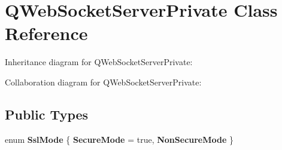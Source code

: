\hypertarget{class_q_web_socket_server_private}{}\section{Q\+Web\+Socket\+Server\+Private Class Reference}
\label{class_q_web_socket_server_private}


Inheritance diagram for Q\+Web\+Socket\+Server\+Private\+:


Collaboration diagram for Q\+Web\+Socket\+Server\+Private\+:
\subsection*{Public Types}
\begin{DoxyCompactItemize}
\item 
\mbox{\label{class_q_web_socket_server_private_a53bc843103a91b9e6b1dcdcf447dbaac}} 
enum {\bfseries Ssl\+Mode} \{ {\bfseries Secure\+Mode} = true, 
{\bfseries Non\+Secure\+Mode}
 \}
\end{DoxyCompactItemize}
